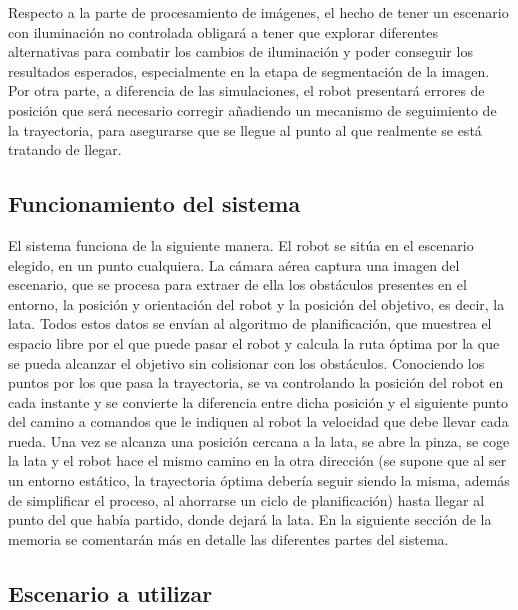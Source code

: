 Respecto a la parte de procesamiento de imágenes, el hecho de tener un escenario con iluminación no controlada obligará a tener que explorar diferentes alternativas para combatir los cambios de iluminación y poder conseguir los resultados esperados, especialmente en la etapa de segmentación de la imagen. Por otra parte, a diferencia de las simulaciones, el robot presentará errores de posición que será necesario corregir añadiendo un mecanismo de seguimiento de la trayectoria, para asegurarse que se llegue al punto al que realmente se está tratando de llegar.\\
 
\subsection{Funcionamiento del sistema}

El sistema funciona de la siguiente manera. El robot se sitúa en el escenario elegido, en un punto cualquiera. La cámara aérea captura una imagen del escenario, que se procesa para extraer de ella los obstáculos presentes en el entorno, la posición y orientación del robot y la posición del objetivo, es decir, la lata. Todos estos datos se envían al algoritmo de planificación, que muestrea el espacio libre por el que puede pasar el robot y calcula la ruta óptima por la que se pueda alcanzar el objetivo sin colisionar con los obstáculos. Conociendo los puntos por los que pasa la trayectoria, se va controlando la posición del robot en cada instante y se convierte la diferencia entre dicha posición y el siguiente punto del camino a comandos que le indiquen al robot la velocidad que debe llevar cada rueda. Una vez se alcanza una posición cercana a la lata, se abre la pinza, se coge la lata y el robot hace el mismo camino en la otra dirección (se supone que al ser un entorno estático, la trayectoria óptima debería seguir siendo la misma, además de simplificar el proceso, al ahorrarse un ciclo de planificación) hasta llegar al punto del que había partido, donde dejará la lata. En la siguiente sección de la memoria se comentarán más en detalle las diferentes partes del sistema.\\

\subsection{Escenario a utilizar}

